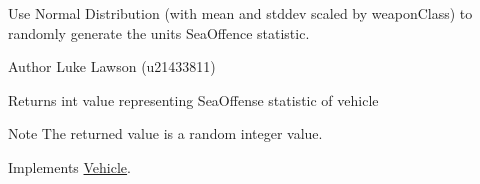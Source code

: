Use Normal Distribution (with mean and stddev scaled by weapon\+Class) to randomly generate the unit\textquotesingle{}s Sea\+Offence statistic. 

\begin{DoxyAuthor}{Author}
Luke Lawson (u21433811) 
\end{DoxyAuthor}
\begin{DoxyReturn}{Returns}
int value representing Sea\+Offense statistic of vehicle 
\end{DoxyReturn}
\begin{DoxyNote}{Note}
The returned value is a random integer value. 
\end{DoxyNote}


Implements \mbox{\hyperlink{class_vehicle_ab70b8c0eef30b37648a1ab9903043f47}{Vehicle}}.

